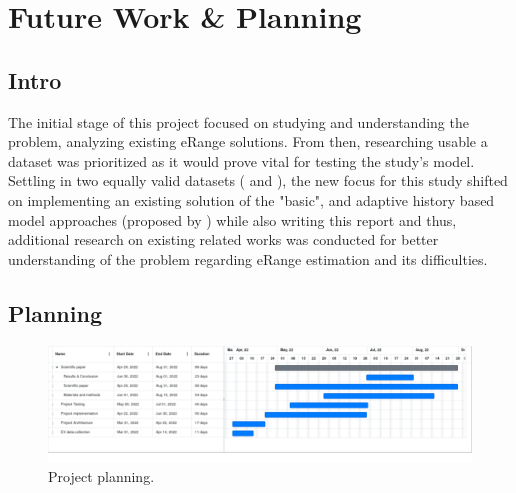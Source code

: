 \chapter{Future Work \& Planning}
\label{cha:planning}
\section{Intro}
\label{sec:planningIntro}
The initial stage of this project focused on 
studying and understanding the problem,
analyzing existing \gls{eRange} solutions.
From then, researching usable a \gls{dataset}
was prioritized as it would prove vital
for testing the study's model.
Settling in two equally valid \glspl{dataset}
(\cite{vedDataset} and \cite{emobpy}),
the new focus for this study shifted on
implementing an existing solution of 
the "basic", and adaptive history based model
approaches (proposed by \cite{classicEVX})
while also writing this report and thus,
additional research on existing related works 
was conducted for better understanding
of the problem regarding \gls{eRange} estimation
and its difficulties.

\section{Planning}
\label{sec:planningPlanning}

\begin{figure}[H]
    \begin{center}
        \includegraphics[scale=0.27]{../figures/planning}
        \caption{Project planning.}
    \end{center}
\end{figure}

